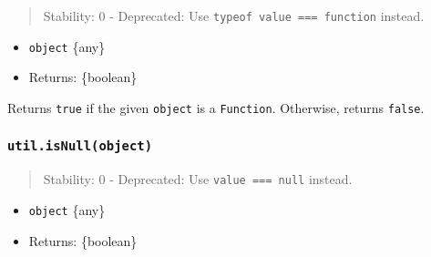 \begin{quote}
Stability: 0 - Deprecated: Use
\texttt{typeof\ value\ ===\ \textquotesingle{}function\textquotesingle{}}
instead.
\end{quote}

\begin{itemize}
\tightlist
\item
  \texttt{object} \{any\}
\item
  Returns: \{boolean\}
\end{itemize}

Returns \texttt{true} if the given \texttt{object} is a
\texttt{Function}. Otherwise, returns \texttt{false}.

\begin{Shaded}
\begin{Highlighting}[]
\OperatorTok{=} \NormalTok{(}\NormalTok{)}\OperatorTok{;}

 \NormalTok{() \{\}}
\OperatorTok{=}\NormalTok{ () }\KeywordTok{=\textgreater{}}\NormalTok{ \{\}}\OperatorTok{;}

\NormalTok{(\{\})}\OperatorTok{;}
\OperatorTok{;}
\OperatorTok{;}
\end{Highlighting}
\end{Shaded}

\subsubsection{\texorpdfstring{\texttt{util.isNull(object)}}{util.isNull(object)}}\label{util.isnullobject}

\begin{quote}
Stability: 0 - Deprecated: Use \texttt{value\ ===\ null} instead.
\end{quote}

\begin{itemize}
\tightlist
\item
  \texttt{object} \{any\}
\item
  Returns: \{boolean\}
\end{itemize}

